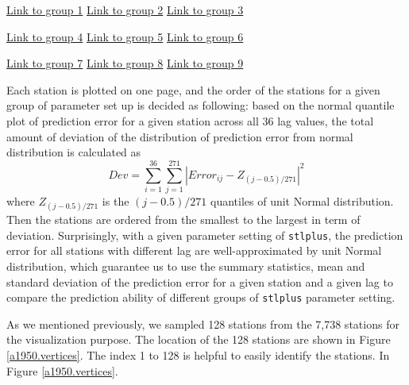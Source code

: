 \begin{framed}
\begin{center}
  \href{../plots/a1950/E1/QQ.error.tmax.group.1.pdf}{Link to group 1} 
  \;\;\;\;\;\;\;\;\;\;
  \href{../plots/a1950/E1/QQ.error.tmax.group.2.pdf}{Link to group 2} 
  \;\;\;\;\;\;\;\;\;\;
  \href{../plots/a1950/E1/QQ.error.tmax.group.3.pdf}{Link to group 3}
\end{center}
\begin{center}
  \href{../plots/a1950/E1/QQ.error.tmax.group.4.pdf}{Link to group 4} 
  \;\;\;\;\;\;\;\;\;\;
  \href{../plots/a1950/E1/QQ.error.tmax.group.5.pdf}{Link to group 5} 
  \;\;\;\;\;\;\;\;\;\;
  \href{../plots/a1950/E1/QQ.error.tmax.group.6.pdf}{Link to group 6}
\end{center}
\begin{center}
  \href{../plots/a1950/E1/QQ.error.tmax.group.7.pdf}{Link to group 7} 
  \;\;\;\;\;\;\;\;\;\;
  \href{../plots/a1950/E1/QQ.error.tmax.group.8.pdf}{Link to group 8} 
  \;\;\;\;\;\;\;\;\;\;
  \href{../plots/a1950/E1/QQ.error.tmax.group.9.pdf}{Link to group 9}
  \label{QQ.error.laggroup.E1}
\end{center}
\end{framed}

Each station is plotted on one page, and the order of the stations for a given 
group of parameter set up is decided as following: 
based on the normal quantile plot of prediction error for a given station across 
all 36 lag values, the total amount of deviation of the distribution of prediction 
error from normal distribution is calculated as
$$
Dev = \sum_{i=1}^{36} \sum_{j=1}^{271} |Error_{ij} - Z_{(j-0.5)/271}|^2
$$
where $Z_{(j-0.5)/271}$ is the $(j-0.5)/271$ quantiles of unit Normal distribution.
Then the stations are ordered from the smallest to the largest in term of 
deviation. Surprisingly, with a given parameter setting of \texttt{stlplus}, the
prediction error for all stations with different lag are well-approximated by
unit Normal distribution, which guarantee us to use the summary statistics, mean
and standard deviation of the prediction error for a given station and a given
lag to compare the prediction ability of different groups of \texttt{stlplus}
parameter setting. 

As we mentioned previously, we sampled 128 stations from the 7,738 stations for
the visualization purpose. The location of the 128 stations are shown in 
Figure \href{../plots/vertices.a1950.pdf}{\ref*{a1950.vertices}}. The index 1
to 128 is helpful to easily identify the stations. In Figure 
\href{../plots/vertices.a1950.pdf}{\ref*{a1950.vertices}}. 

